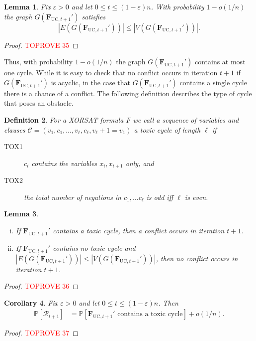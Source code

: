 \documentclass[10pt,reqno]{amsart}
\numberwithin{equation}{section}
\newcommand{\tox}{\cC}
\newcommand{\toxl}{\tox}
\renewcommand{\vec}[1]{\boldsymbol{#1}}
\newcommand{\FUC}[1]{\PHI_{\mathrm{UC},{#1}}}
\newcommand\PHI{\vec F}
\newcommand\cC{\mathcal C}
\newcommand\cR{\mathcal R}
\newcommand\eps{\varepsilon}
\newcommand\brk[1]{\left\lbrack{#1}\right\rbrack}
\newcommand\pr{\mathbb{P}}
\newtheorem{definition}{Definition}[section]
\newtheorem{lemma}[definition]{Lemma}
\newtheorem{corollary}[definition]{Corollary}
\def\pr{{\mathbb P}}
\begin{document}
\begin{lemma}\label{lemma_arnab}
	Fix $\eps>0$ and let $0\leq t\leq(1-\eps)n$.
	With probability $1-o(1/n)$ the graph $G(\FUC{t+1}')$ satisfies 
			$$|E(G(\FUC{t+1}'))|\leq|V(G(\FUC{t+1}'))|.$$
\end{lemma}
\begin{proof}\textcolor{red}{TOPROVE 35}\end{proof}

Thus, with probability $1-o(1/n)$ the graph $G(\FUC{t+1}')$ contains at most one cycle.
While it is easy to check that no conflict occurs in iteration $t+1$ if $G(\FUC{t+1}')$ is acyclic, in the case that $G(\FUC{t+1}')$ contains a single cycle there is a chance of a conflict.
The following definition describes the type of cycle that poses an obstacle.

\begin{definition}
	For a XORSAT formula $F$ we call a sequence of variables and clauses $\toxl=(v_1, c_1, \dots, v_\ell, c_\ell, v_\ell+1=v_1)$ a \emph{toxic cycle} of length $\ell$ if 
	\begin{description}
		\item[TOX1] $c_i$ contains the variables $x_i, x_{i+1}$ only, and
		\item[TOX2] the total number of negations in $c_1, \dots c_\ell$ is odd iff $\ell$ is even.
	\end{description}
\end{definition}

\begin{lemma}\label{lem_tox}
	\begin{enumerate}[(i)]
		\item If $\FUC{t+1}'$ contains a toxic cycle, then a conflict occurs in iteration $t+1$.
		\item If $\FUC{t+1}'$ contains no toxic cycle and $|E(G(\FUC{t+1}'))|\leq|V(G(\FUC{t+1}'))|$, then no conflict occurs in iteration $t+1$.
	\end{enumerate}
\end{lemma}
\begin{proof}\textcolor{red}{TOPROVE 36}\end{proof}
	
\begin{corollary}\label{lem_tox_error_t}
	Fix $\eps>0$ and let $0\leq t\leq(1-\eps)n$.
	Then
	\begin{align*}
		\pr\brk{\cR_{t+1}}&=\pr\brk{\mbox{$\FUC{t+1}'$ contains a toxic cycle}}+o(1/n).
	\end{align*}
\end{corollary}
\begin{proof}\textcolor{red}{TOPROVE 37}\end{proof}
\end{document}
